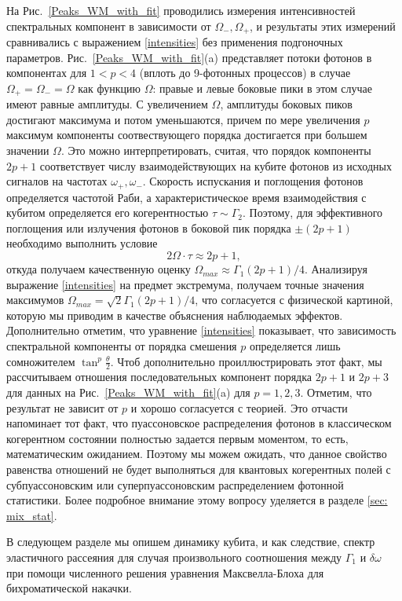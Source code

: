 На Рис.~\ref{Peaks_WM_with_fit} проводились измерения интенсивностей спектральных компонент в зависимости от $\Omega_-, \Omega_+$, и результаты этих измерений сравнивались с выражением \eqref{intensities} без применения подгоночных параметров. Рис.~\ref{Peaks_WM_with_fit}(a) представляет потоки фотонов в компонентах для  $1< p < 4$ (вплоть до 9-фотонных процессов) в случае $\Omega_+\!=\!\Omega_-\!=\!\Omega$ как функцию $\Omega$: правые и левые боковые пики в этом случае имеют равные амплитуды. С увеличением $\Omega$, амплитуды боковых пиков достигают максимума и потом уменьшаются, причем по мере увеличения $p$ максимум компоненты соотвествующего порядка достигается при большем значении $\Omega$. Это можно интерпретировать, считая, что порядок компоненты $2p + 1$ соответствует числу взаимодействующих на кубите фотонов из исходных сигналов на частотах $\omega_+, \omega_-$. Скорость испускания и поглощения фотонов определяется частотой Раби, а характеристическое время взаимодействия с кубитом определяется его когерентностью $\tau \sim \Gamma_2$. Поэтому, для эффективного поглощения или излучения фотонов в боковой пик порядка $\pm(2p+1)$ необходимо выполнить условие
\begin{equation}
2\Omega\cdot \tau \approx 2p+1,
\end{equation}
откуда получаем качественную оценку $\Omega_{max} \approx \Gamma_1(2p+1)/4$. Анализируя выражение \eqref{intensities} на предмет экстремума, получаем точные значения максимумов $\Omega_{max} = \sqrt{2} \Gamma_1(2p+1)/4$, что согласуется с физической картиной, которую мы приводим в качестве объяснения наблюдаемых эффектов. Дополнительно отметим, что уравнение \eqref{intensities} показывает, что зависимость спектральной компоненты от порядка смешения $p$ определяется лишь сомножителем $\tan^p\frac{\theta}{2}$. Чтоб дополнительно проиллюстрировать этот факт, мы рассчитываем отношения последовательных компонент порядка $2p+1$ и $2p+3$ для данных на Рис.~\ref{Peaks_WM_with_fit}(a) для $p=1,2,3$. Отметим, что результат не зависит от $p$ и хорошо согласуется с теорией. Это отчасти напоминает тот факт, что пуассоновское распределения фотонов в классическом когерентном состоянии полностью задается первым моментом, то есть, математическим ожиданием. Поэтому мы можем ожидать, что данное свойство равенства отношений не будет выполняться для квантовых когерентных полей с субпуассоновским или суперпуассоновским распределением фотонной статистики. Более подробное внимание этому вопросу уделяется в разделе \ref{sec: mix_stat}.

В следующем разделе мы опишем динамику кубита, и как следствие, спектр эластичного рассеяния для случая произвольного соотношения между $\Gamma_1$ и $\delta\omega$ при помощи численного решения уравнения Максвелла-Блоха для бихроматической накачки.    

